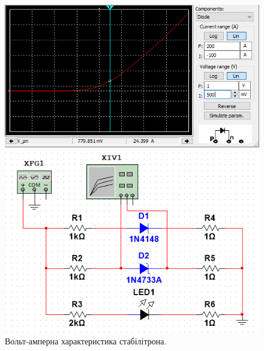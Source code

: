 \documentclass{article}
\begin{document}
\begin{normalsize}
	\begin{figure}[H]
		\begin{minipage}[t]{0.55\textwidth}
			\centering
			\includegraphics[width=\textwidth]{21}
		\end{minipage}
		\hfill
		\begin{minipage}[t]{0.35\textwidth}
			\centering
			\includegraphics[width=\textwidth]{22}
		\end{minipage}
		\caption{Вольт-амперна характеристика стабілітрона.}
	\end{figure}


\end{normalsize}
\end{document}
